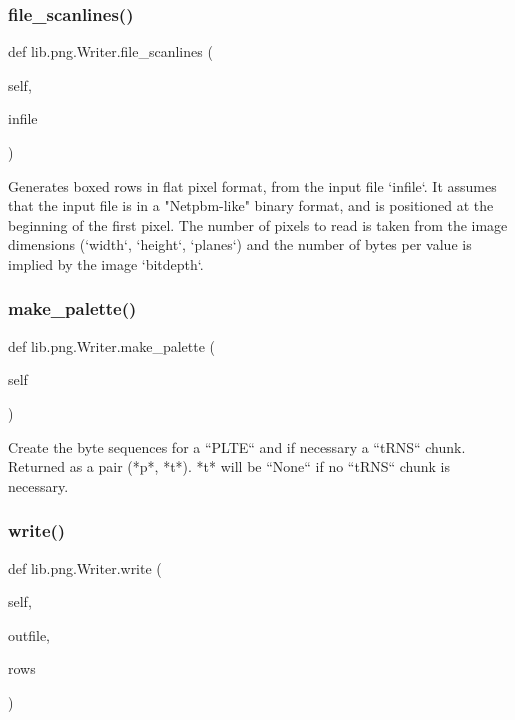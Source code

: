 \subsubsection{\texorpdfstring{file\+\_\+scanlines()}{file\_scanlines()}}
{\footnotesize\ttfamily def lib.\+png.\+Writer.\+file\+\_\+scanlines (\begin{DoxyParamCaption}\item[{}]{self,  }\item[{}]{infile }\end{DoxyParamCaption})}

\begin{DoxyVerb}Generates boxed rows in flat pixel format, from the input file
`infile`.  It assumes that the input file is in a "Netpbm-like"
binary format, and is positioned at the beginning of the first
pixel.  The number of pixels to read is taken from the image
dimensions (`width`, `height`, `planes`) and the number of bytes
per value is implied by the image `bitdepth`.
\end{DoxyVerb}
 \mbox{\label{classlib_1_1png_1_1_writer_a011e08b5ac4df1948bf7ff7a2c634490}} 
\subsubsection{\texorpdfstring{make\+\_\+palette()}{make\_palette()}}
{\footnotesize\ttfamily def lib.\+png.\+Writer.\+make\+\_\+palette (\begin{DoxyParamCaption}\item[{}]{self }\end{DoxyParamCaption})}

\begin{DoxyVerb}Create the byte sequences for a ``PLTE`` and if necessary a
``tRNS`` chunk.  Returned as a pair (*p*, *t*).  *t* will be
``None`` if no ``tRNS`` chunk is necessary.
\end{DoxyVerb}
 \mbox{\label{classlib_1_1png_1_1_writer_a836164ca6ef355bd473162afa9811607}} 
\subsubsection{\texorpdfstring{write()}{write()}}
{\footnotesize\ttfamily def lib.\+png.\+Writer.\+write (\begin{DoxyParamCaption}\item[{}]{self,  }\item[{}]{outfile,  }\item[{}]{rows }\end{DoxyParamCaption})}

